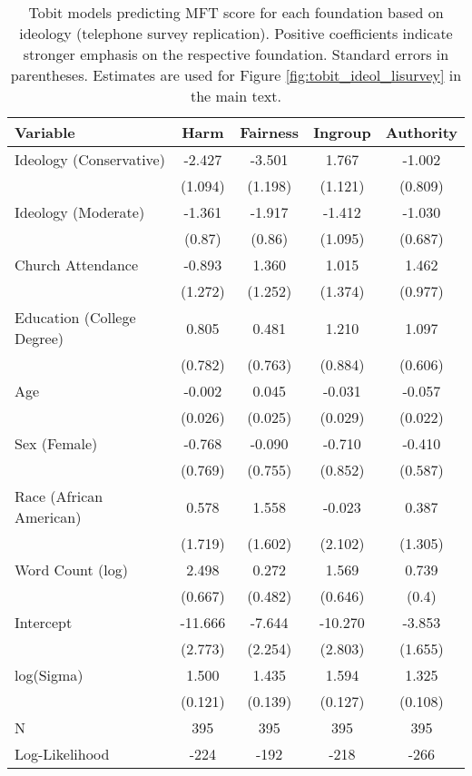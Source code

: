 \begin{table}[ht]
\centering
\caption{Tobit models predicting MFT score for each foundation based 
           on ideology (telephone survey replication). Positive coefficients indicate stronger emphasis on the respective 
           foundation. Standard errors in parentheses. Estimates are used for Figure 
           \ref{fig:tobit_ideol_lisurvey} in the main text.} 
\label{tab:tobit_ideol_lisurvey}
\begingroup\footnotesize
\begin{tabular}{lcccc}
  \hline
Variable & Harm & Fairness & Ingroup & Authority \\ 
  \hline
Ideology (Conservative) &  -2.427 & -3.501 &   1.767 & -1.002 \\ 
   & (1.094) & (1.198) & (1.121) & (0.809) \\ 
  Ideology (Moderate) &  -1.361 & -1.917 &  -1.412 & -1.030 \\ 
   & (0.87) & (0.86) & (1.095) & (0.687) \\ 
  Church Attendance &  -0.893 &  1.360 &   1.015 &  1.462 \\ 
   & (1.272) & (1.252) & (1.374) & (0.977) \\ 
  Education (College Degree) &   0.805 &  0.481 &   1.210 &  1.097 \\ 
   & (0.782) & (0.763) & (0.884) & (0.606) \\ 
  Age &  -0.002 &  0.045 &  -0.031 & -0.057 \\ 
   & (0.026) & (0.025) & (0.029) & (0.022) \\ 
  Sex (Female) &  -0.768 & -0.090 &  -0.710 & -0.410 \\ 
   & (0.769) & (0.755) & (0.852) & (0.587) \\ 
  Race (African American) &   0.578 &  1.558 &  -0.023 &  0.387 \\ 
   & (1.719) & (1.602) & (2.102) & (1.305) \\ 
  Word Count (log) &   2.498 &  0.272 &   1.569 &  0.739 \\ 
   & (0.667) & (0.482) & (0.646) & (0.4) \\ 
  Intercept & -11.666 & -7.644 & -10.270 & -3.853 \\ 
   & (2.773) & (2.254) & (2.803) & (1.655) \\ 
  log(Sigma) &   1.500 &  1.435 &   1.594 &  1.325 \\ 
   & (0.121) & (0.139) & (0.127) & (0.108) \\ 
   \hline
N & 395 & 395 & 395 & 395 \\ 
  Log-Likelihood & -224 & -192 & -218 & -266 \\ 
   \hline
\end{tabular}
\endgroup
\end{table}
